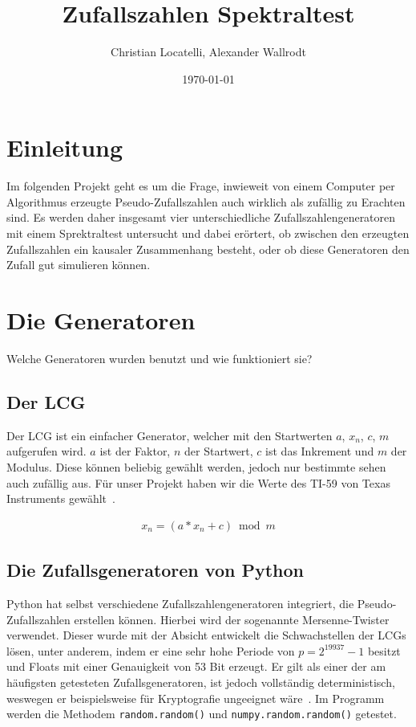 \documentclass[12pt]{article}
\title{\textbf{Zufallszahlen Spektraltest}}
\author{Christian Locatelli, Alexander Wallrodt}
\date{\today}
\begin{document}
    \maketitle
    \clearpage

    \tableofcontents
    \listoftables
    \listoffigures

    \clearpage


    \section{Einleitung}\label{sec:Einleitung}
    Im folgenden Projekt geht es um die Frage, inwieweit von einem Computer per Algorithmus erzeugte Pseudo-Zufallszahlen
    auch wirklich als zufällig zu Erachten sind.
    Es werden daher insgesamt vier unterschiedliche Zufallszahlengeneratoren mit einem Sprektraltest untersucht und dabei erörtert,
    ob zwischen den erzeugten Zufallszahlen ein kausaler Zusammenhang besteht,
    oder ob diese Generatoren den Zufall gut simulieren können.

    \section{Die Generatoren}\label{sec:die-generatoren}
    Welche Generatoren wurden benutzt und wie funktioniert sie?

    \subsection{Der LCG}\label{subsec:der-lcg}
    Der LCG ist ein einfacher Generator, welcher mit den Startwerten $a$, $x_n$, $c$, $m$ aufgerufen wird.
    $a$ ist der Faktor, $n$ der Startwert, $c$ ist das Inkrement und $m$ der Modulus.
    Diese können beliebig gewählt werden, jedoch nur bestimmte sehen auch zufällig aus.
    Für unser Projekt haben wir die Werte des TI-59 von Texas Instruments gewählt~\cite{lcg}.

    \begin{align*}
    x_n = (a * x_n + c) \bmod m
    \end{align*}

    \subsection{Die Zufallsgeneratoren von Python}\label{subsec:die-zufallsgeneratoren-von-python}
    Python hat selbst verschiedene Zufallszahlengeneratoren integriert, die Pseudo-Zufallszahlen erstellen können.
    Hierbei wird der sogenannte Mersenne-Twister verwendet.
    Dieser wurde mit der Absicht entwickelt die Schwachstellen der LCGs lösen, unter anderem,
    indem er eine sehr hohe Periode von $p=2^{19937}-1$ besitzt und Floats mit einer Genauigkeit von 53 Bit erzeugt.
    Er gilt als einer der am häufigsten getesteten Zufallsgeneratoren, ist jedoch vollständig deterministisch,
    weswegen er beispielsweise für Kryptografie ungeeignet wäre~\cite{python-random,mersenne-twister}.
    Im Programm werden die Methodem \texttt{random.random()} und \texttt{numpy.random.random()} getestet.
\end{document}
